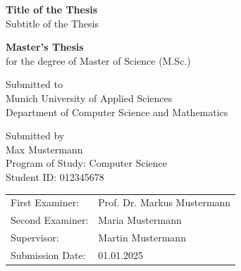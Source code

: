 \begin{titlepage}
  \thispagestyle{empty}


  \vspace{2cm}

  \begin{center}
    {\LARGE \textbf{Title of the Thesis} \\}
    \vspace{0.5cm}
    {\large Subtitle of the Thesis}

    \vspace{1.2cm}
    {\large \textbf{Master's Thesis} \\}
    \vspace{0.2cm}
    for the degree of Master of Science (M.Sc.)

    \vspace{1.2cm}
    Submitted to \\
    Munich University of Applied Sciences \\
    Department of Computer Science and Mathematics

    \vspace{1.2cm}
    Submitted by \\
    Max Mustermann \\
    Program of Study: Computer Science\\
    Student ID: 012345678
  \end{center}

  \vfill

\begingroup
\renewcommand{\arraystretch}{1.0}
\begin{tabular}{@{}ll@{}}
  First Examiner:  & Prof. Dr. Markus Mustermann \\
  Second Examiner: & Maria Mustermann \\
  Supervisor:    & Martin Mustermann \\
  Submission Date: & 01.01.2025 \\
\end{tabular}
\endgroup

\end{titlepage}
\addtocounter{page}{1}
